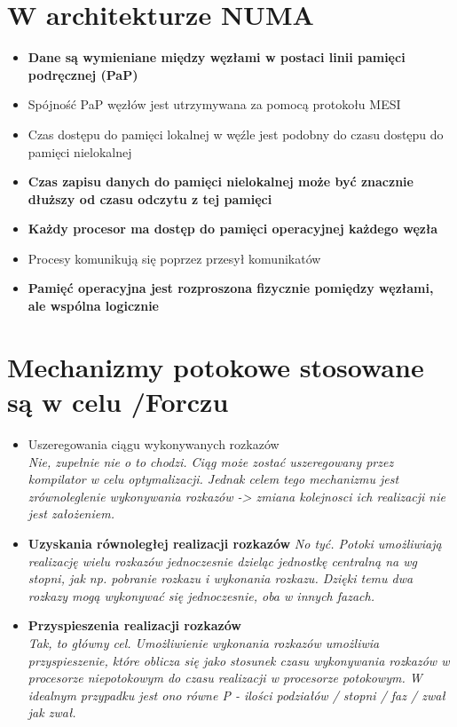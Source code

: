 \documentclass[a4paper,twoside]{article}
\begin{document}
\section{W architekturze NUMA}
	\begin{itemize}
    \item \textbf{Dane są wymieniane między węzłami w postaci linii pamięci podręcznej (PaP)}
    \item Spójność PaP węzłów jest utrzymywana za pomocą protokołu MESI
    \item Czas dostępu do pamięci lokalnej w węźle jest podobny do czasu dostępu do pamięci nielokalnej
    \item \textbf{Czas zapisu danych do pamięci nielokalnej może być znacznie dłuższy od czasu odczytu z tej pamięci}
    \item \textbf{Każdy procesor ma dostęp do pamięci operacyjnej każdego węzła}
    \item Procesy komunikują się poprzez przesył komunikatów
    \item \textbf{Pamięć operacyjna jest rozproszona fizycznie pomiędzy węzłami, ale wspólna logicznie}
    \end{itemize}

\section{Mechanizmy potokowe stosowane są w celu {\small /Forczu}}
	\begin{itemize}
    \item Uszeregowania ciągu wykonywanych rozkazów\\
    {\small \emph{Nie, zupełnie nie o to chodzi. Ciąg może zostać uszeregowany przez kompilator w celu optymalizacji. Jednak celem tego mechanizmu jest zrównoleglenie wykonywania rozkazów -> zmiana kolejnosci ich realizacji nie jest założeniem.}}
    \item \textbf{Uzyskania równoległej realizacji rozkazów}
    {\small \emph{No tyć. Potoki umożliwiają realizację wielu rozkazów jednoczesnie dzieląc jednostkę centralną na wg stopni, jak np. pobranie rozkazu i wykonania rozkazu. Dzięki temu dwa rozkazy mogą wykonywać się jednoczesnie, oba w innych fazach.}}
    \item \textbf{Przyspieszenia realizacji rozkazów}\\
    {\small \emph{Tak, to główny cel. Umożliwienie wykonania rozkazów umożliwia przyspieszenie, które oblicza się jako stosunek czasu wykonywania rozkazów w procesorze niepotokowym do czasu realizacji w procesorze potokowym. W idealnym przypadku jest ono równe \emph{P} - ilości podziałów / stopni / faz / zwał jak zwał.}}
    \end{itemize}
\end{document}
